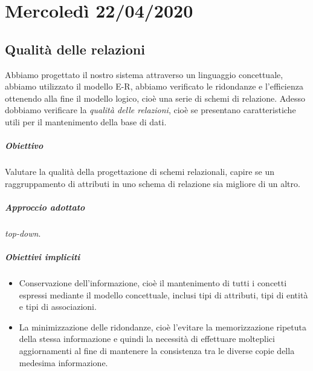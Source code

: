\chapter{Mercoledì 22/04/2020}
\section{Qualità delle relazioni}
Abbiamo progettato il nostro sistema attraverso un linguaggio concettuale, abbiamo utilizzato il modello E-R, abbiamo verificato le ridondanze e l'efficienza ottenendo alla fine il modello logico, cioè una serie di schemi di relazione. Adesso dobbiamo verificare la \emph{qualità delle relazioni}, cioè se presentano caratteristiche utili per il mantenimento della base di dati.
\paragraph{Obiettivo} Valutare la qualità della progettazione di schemi relazionali, capire se un raggruppamento di attributi in uno schema di relazione sia migliore di un altro.
\paragraph{Approccio adottato} \emph{top-down}.
\paragraph{Obiettivi impliciti}
\begin{itemize}
	\item Conservazione dell'informazione, cioè il mantenimento di tutti i concetti espressi mediante il modello concettuale, inclusi tipi di attributi, tipi di entità e tipi di associazioni.
	\item La minimizzazione delle ridondanze, cioè l'evitare la memorizzazione ripetuta della stessa informazione e quindi la necessità di effettuare molteplici aggiornamenti al fine di mantenere la consistenza tra le diverse copie della medesima informazione.
\end{itemize}
